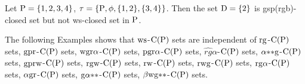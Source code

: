 \begin{exm}\label{exam2.1.6}
Let $\mathrm{P} = \{1, 2, 3, 4\}$, $\tau = \{\mathrm{P}, \phi, \{1, 2\}, \{3, 4\}\}$. Then the set $\mathrm{D}= \{2\}$ is gsp(rgb)-closed set but not ws-closed set in $\mathrm{P}$.
\end{exm}

\begin{rem}\label{rem2.1.1}
The following Examples shows that $\mathrm{ws}$-$\mathrm{C}(\mathrm{P})$ sets are independent of $\mathrm{rg}$-$\mathrm{C}(\mathrm{P})$ sets, $\mathrm{gpr}$-$\mathrm{C}(\mathrm{P})$ sets, $\mathrm{wgr}\alpha$-$\mathrm{C}(\mathrm{P})$ sets, $\mathrm{pgr}\alpha$-$\mathrm{C}(\mathrm{P})$ sets, $\widehat{rg}\alpha$-$\mathrm{C}(\mathrm{P})$ sets, $\alpha{*}{*}\mathrm{g}$-$\mathrm{C}(\mathrm{P})$ sets, $\mathrm{gprw}$-$\mathrm{C}(\mathrm{P})$ sets, $\mathrm{rgw}$-$\mathrm{C}(\mathrm{P})$ sets, $\mathrm{rw}$-$\mathrm{C}(\mathrm{P})$ sets, $\mathrm{rwg}$-$\mathrm{C}(\mathrm{P})$ sets, $\mathrm{rg}\alpha$-$\mathrm{C}(\mathrm{P})$ sets, $\alpha\mathrm{gr}$-$\mathrm{C}(\mathrm{P})$ sets, $\mathrm{g}\alpha {*}{*}$-$\mathrm{C}(\mathrm{P})$ sets, $\beta \mathrm{wg}{*}{*}$-$\mathrm{C}(\mathrm{P})$ sets.
\end{rem}

